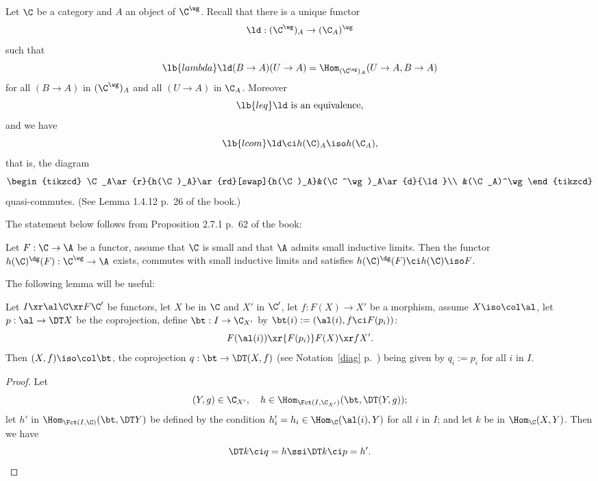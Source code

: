 \documentclass[12pt]{article}
\theoremstyle{remark}
\theoremstyle{definition}
\begin{document}
Let $\C$ be a category and $A$ an object of $\C^\wg$. Recall that there is a unique functor 
$$
\ld:(\C^\wg)_A\to(\C_A)^\wg
$$ 
such that 
%
\begin{equation}\lb{lambda}
\ld(B\to A)(U\to A)=\Hom_{(\C^\wg)_A}(U\to A,B\to A)
\end{equation} 
%
for all $(B\to A)$ in $(\C^\wg)_A$ and all $(U\to A)$ in $\C_A$. Moreover 
\begin{equation}\lb{leq}
\text{$\ld$ is an equivalence,}
\end{equation} 
and we have 
\begin{equation}\lb{lcom}
\ld\ci h(\C)_A\iso h(\C_A),
\end{equation}
that is, the diagram
$$
\begin{tikzcd}
\C_A\ar{r}{h(\C)_A}\ar{rd}[swap]{h(\C)_A}&(\C^\wg)_A\ar{d}{\ld}\\ 
&(\C_A)^\wg
\end{tikzcd}
$$ 
quasi-commutes. (See Lemma 1.4.12 p.~26 of the book.) 

The statement below follows from Proposition 2.7.1 p.~62 of the book:

\begin{prop}
Let $F:\C\to\A$ be a functor, assume that $\C$ is small and that $\A$ admits small inductive limits. Then the functor $h(\C)^\dg(F):\C^\wg\to\A$ exists, commutes with small inductive limits and satisfies $h(\C)^\dg(F)\ci h(\C)\iso F$.
\end{prop}



The following lemma will be useful:

\begin{lem}
Let $I\xr\al\C\xr F\C'$ be functors, let $X$ be in $\C$ and $X'$ in $\C'$, let $f:F(X)\to X'$ be a morphism, assume $X\iso\col\al$, let $p:\al\to\DT X$ be the coprojection, define $\bt:I\to\C_{X'}$ by $\bt(i):=(\al(i),f\ci F(p_i))$:
$$
F(\al(i))\xr{F(p_i)}F(X)\xr fX'.
$$ 
Then $(X,f)\iso\col\bt$, the coprojection $q:\bt\to\DT(X,f)$ (see Notation~\ref{diag} p.~) being given by $q_i:=p_i$ for all $i$ in $I$.
\end{lem}
\begin{proof}
Let 
$$
(Y,g)\in\C_{X'},\quad h\in\Hom_{\Fct(I,\C_{X'})}(\bt,\DT(Y,g));
$$ 
let $h'$ in $\Hom_{\Fct(I,\C)}(\bt,\DT Y)$ be defined by the condition $h'_i=h_i\in\Hom_\C(\al(i),Y)$ for all $i$ in $I$; and let $k$ be in $\Hom_\C(X,Y)$. Then we have 
$$
\DT k\ci q=h\ssi\DT k\ci p=h'.
$$
\end{proof}
\end{document}
